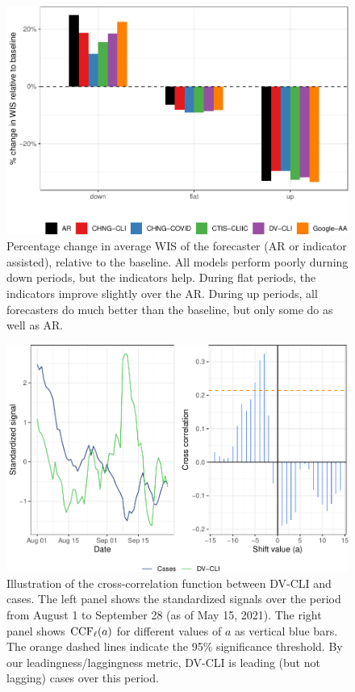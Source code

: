 \documentclass[9pt,twoside,lineno]{pnas-new}
\begin{document}
\begin{figure}

{\centering \includegraphics[width=\textwidth]{fig/upswing-summary-remake-1} 

}

\caption{Percentage change in average WIS of the forecaster (AR or indicator assisted), relative to the baseline. All models perform poorly durning down periods, but the indicators help. During flat periods, the indicators improve slightly over the AR. During up periods, all forecasters do much better than the baseline, but only some do as well as AR.}\label{fig:upswing-summary-remake}
\end{figure}

\clearpage

\begin{figure}

{\centering \includegraphics[width=\textwidth]{fig/ccf-dv-finalized-1} 

}

\caption{Illustration of the cross-correlation function between DV-CLI and cases. The left panel shows the standardized signals over the period from August 1 to September 28 (as of May 15, 2021). The right panel shows $\mathrm{CCF}_{\ell}(a)$ for different values of $a$ as vertical blue bars. The orange dashed lines indicate the 95\% significance threshold. By our leadingness/laggingness metric, DV-CLI is leading (but not lagging) cases over this period.}\label{fig:ccf-dv-finalized}
\end{figure}
\end{document}
